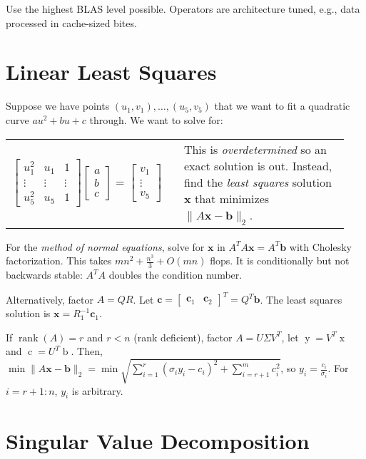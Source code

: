 \documentclass[landscape,10pt,letterpaper]{article}
\newcommand{\heading}[1]{\vspace{-1.5em} \section*{#1} \vspace{-1.0em}}
\begin{document}
\begin{multicols}{4}
Use the highest BLAS level possible.  Operators are architecture tuned, e.g., data processed in cache-sized bites.

\heading{Linear Least Squares}

Suppose we have points $(u_1, v_1), \ldots, (u_5, v_5)$ that we want to fit a quadratic curve $au^2 + bu + c$ through.  We want to solve for: \\
\begin{tabular}[t]{p{0.48\linewidth}p{0.46\linewidth}}
$\left[ \begin{array}{ccc} u_1^2 & u_1 & 1 \\ \vdots & \vdots & \vdots \\ u_5^2 & u_5 & 1 \end{array} \right] \!\!\! \left[ \begin{array}{c} a \\ b \\ c \end{array} \right] \!\! = \!\! \left[ \begin{array}{c} v_1 \\ \vdots \\ v_5 \end{array} \right]$ &
\vspace{-2em} This is \emph{overdetermined} so an exact solution is out.  Instead, find the \emph{least squares} solution $\mathbf{x}$ that minimizes $\| A \mathbf{x} - \mathbf{b} \|_2$.
\end{tabular}

For the \emph{method of normal equations}, solve for $\mathbf{x}$ in $A^TA \mathbf{x} = A^T \mathbf{b}$ with Cholesky factorization.  This takes $mn^2 + \frac{n^3}{3} + O(mn)$ flops.  It is conditionally but not backwards stable: $A^TA$ doubles the condition number.

Alternatively, factor $A=QR$.  Let $\mathbf{c} = [\begin{array}{cc} \mathbf{c}_1 & \mathbf{c}_2 \end{array}]^T = Q^T \mathbf{b}$.  The least squares solution is $\mathbf{x} = R_1^{-1} \mathbf{c}_1$.

If $\mathop{rank}(A) = r$ and $r < n$ (rank deficient), factor $A = U \Sigma V^T$, let $\mathop{y} = V^T \mathop{x}$ and $\mathop{c} = U^T \mathop{b}$.  Then, $\min \| A \mathbf{x} - \mathbf{b} \|_2 = \min \sqrt{\sum_{i=1}^r (\sigma_i y_i - c_i)^2 + \sum_{i=r+1}^m c_i^2}$, so $y_i = \frac{c_i}{\sigma_i}$.  For $i = r+1:n$, $y_i$ is arbitrary.

\heading{Singular Value Decomposition}


\end{multicols}
\end{document}
